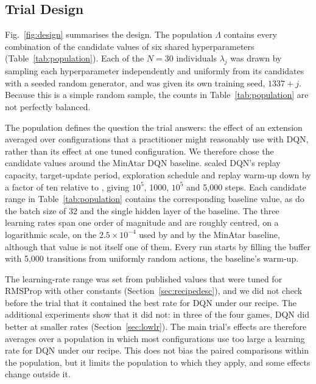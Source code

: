 \documentclass[conference,a4paper]{IEEEtran}
\newcommand{\results}{../analysis_output/corrected-rct-01/report}
\begin{document}
\subsection{Trial Design}\label{sec:design}
Fig.~\ref{fig:design} summarises the design. The population $\Lambda$ contains every combination of the candidate
values of six shared hyperparameters (Table~\ref{tab:population}). Each of the $N=30$ individuals $\lambda_j$ was drawn
by sampling each hyperparameter independently and uniformly from its candidates with a seeded random generator, and
was given its own training seed, $1337+j$. Because this is a simple random sample, the counts in
Table~\ref{tab:population} are not perfectly balanced.

\begin{table}[t]
\caption{Shared Hyperparameter Population and the Sampled Individuals}
\label{tab:population}
\centering
\footnotesize

\end{table}

The population defines the question the trial answers: the effect of an extension averaged over configurations that a
practitioner might reasonably use with DQN, rather than its effect at one tuned configuration. We therefore chose the
candidate values around the MinAtar DQN baseline. \citet{young2019minatar} scaled DQN's replay capacity,
target-update period, exploration schedule and replay warm-up down by a factor of ten relative to
\citet{mnih2015human}, giving $10^5$, 1000, $10^5$ and 5,000 steps. Each candidate range in Table~\ref{tab:population}
contains the corresponding baseline value, as do the batch size of 32 and the single hidden layer of the baseline. The
three learning rates span one order of magnitude and are roughly centred, on a logarithmic scale, on the
$2.5\times10^{-4}$ used by \citet{mnih2015human} and by the MinAtar baseline, although that value is not itself one of
them. Every run starts by filling the buffer with 5,000 transitions from uniformly random actions, the baseline's
warm-up.

The learning-rate range was set from published values that were tuned for RMSProp with other constants
(Section~\ref{sec:recipedesc}), and we did not check before the trial that it contained the best rate for DQN under our
recipe. The additional experiments show that it did not: in three of the four games, DQN did better at smaller rates
(Section~\ref{sec:lowlr}). The main trial's effects are therefore averages over a population in which most
configurations use too large a learning rate for DQN under our recipe. This does not bias the paired comparisons within
the population, but it limits the population to which they apply, and some effects change outside it.
\end{document}
